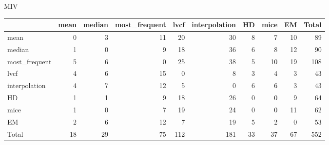 \documentclass{article}
\begin{document}
{\large MIV}
\begin{tabular}{lrrrrrrrrr}
\hline
               &   mean &   median &   most\_frequent &   lvcf &   interpolation &   HD &   mice &   EM &   Total \\
\hline
 mean          &      0 &        3 &              11 &     20 &              30 &    8 &      7 &   10 &      89 \\
 median        &      1 &        0 &               9 &     18 &              36 &    6 &      8 &   12 &      90 \\
 most\_frequent &      5 &        6 &               0 &     25 &              38 &    5 &     10 &   19 &     108 \\
 lvcf          &      4 &        6 &              15 &      0 &               8 &    3 &      4 &    3 &      43 \\
 interpolation &      4 &        7 &              12 &      5 &               0 &    6 &      6 &    3 &      43 \\
 HD            &      1 &        1 &               9 &     18 &              26 &    0 &      0 &    9 &      64 \\
 mice          &      1 &        0 &               7 &     19 &              24 &    0 &      0 &   11 &      62 \\
 EM            &      2 &        6 &              12 &      7 &              19 &    5 &      2 &    0 &      53 \\
 Total         &     18 &       29 &              75 &    112 &             181 &   33 &     37 &   67 &     552 \\
\hline
\end{tabular}
\vspace{.5cm}
\end{document}
